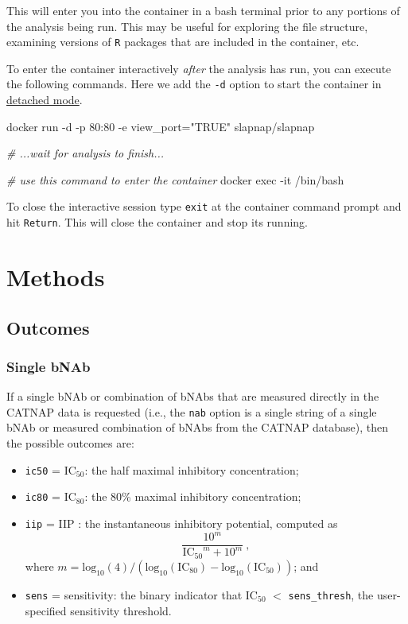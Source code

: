 \documentclass[]{article}
\newenvironment{Shaded}{\begin{snugshade}}{\end{snugshade}}
\newcommand{\StringTok}[1]{\textcolor[rgb]{0.31,0.60,0.02}{#1}}
\newcommand{\CommentTok}[1]{\textcolor[rgb]{0.56,0.35,0.01}{\textit{#1}}}
\newcommand{\ExtensionTok}[1]{#1}
\newcommand{\NormalTok}[1]{#1}
\providecommand{\tightlist}{%
  \setlength{\itemsep}{0pt}\setlength{\parskip}{0pt}}
\begin{document}
This will enter you into the container in a bash terminal prior to any
portions of the analysis being run. This may be useful for exploring the
file structure, examining versions of \texttt{R} packages that are
included in the container, etc.

To enter the container interactively \emph{after} the analysis has run,
you can execute the following commands. Here we add the \texttt{-d}
option to start the container in
\href{https://docs.docker.com/engine/reference/run/\#detached--d}{detached
mode}.

\begin{Shaded}
\begin{Highlighting}[]
\ExtensionTok{docker}\NormalTok{ run -d -p 80:80 -e view_port=}\StringTok{"TRUE"}\NormalTok{ slapnap/slapnap}

\CommentTok{# ...wait for analysis to finish...}

\CommentTok{# use this command to enter the container}
\ExtensionTok{docker}\NormalTok{ exec -it /bin/bash}
\end{Highlighting}
\end{Shaded}

To close the interactive session type \texttt{exit} at the container
command prompt and hit \texttt{Return}. This will close the container
and stop its running.

\section{Methods}\label{sec:methods}

\subsection{Outcomes}\label{sec:outcomedefs}

\subsubsection{Single bNAb}\label{single-bnab}

If a single bNAb or combination of bNAbs that are measured directly in
the CATNAP data is requested (i.e., the \texttt{nab} option is a single
string of a single bNAb or measured combination of bNAbs from the CATNAP
database), then the possible outcomes are:

\begin{itemize}
\tightlist
\item
  \texttt{ic50} = IC\(_{50}\): the half maximal inhibitory
  concentration;
\item
  \texttt{ic80} = IC\(_{80}\): the 80\% maximal inhibitory
  concentration;
\item
  \texttt{iip} = IIP \citep[\citet{wagh2016optimal}]{shen2008dose}: the
  instantaneous inhibitory potential, computed as
  \[ \frac{10^m}{\mbox{IC$_{50}$}^m + 10^m} \ , \] where
  \(m = \mbox{log}_{10}(4) / (\mbox{log}_{10}(\mbox{IC}_{80}) - \mbox{log}_{10}(\mbox{IC}_{50}))\);
  and
\item
  \texttt{sens} = sensitivity: the binary indicator that IC\(_{50}\)
  \(<\) \texttt{sens\_thresh}, the user-specified sensitivity threshold.
\end{itemize}
\end{document}
